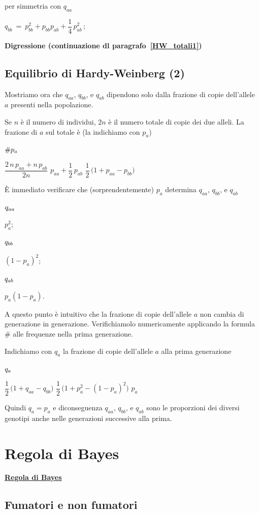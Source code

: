 \documentclass[12pt,openany]{book}
\theoremstyle{mio}
\theoremstyle{liscio}
\begin{document}
per simmetria con $q_{aa}$

$q_{bb}\ =\ p_{bb}^2+p_{bb}p_{ab} +\dfrac{1}{4}\,p^2_{ab}\,$;


\hfill{}\clearpage\hfill\textbf{Digressione (continuazione dl paragrafo~\ref{HW_totali1})}\subsection{Equilibrio di Hardy-Weinberg (2)}

\def\ceq#1#2#3{\parbox{12ex}{$\displaystyle #1$}\medrel{#2}$\displaystyle  #3$}

Mostriamo ora che $q_{aa}$, $q_{bb}$, e $q_{ab}$ dipendono solo dalla frazione di copie dell'allele $a$ presenti nella popolazione. 

Se $n$ \`e il numero di individui, $2n$ è il numero totale di copie dei due alleli. La frazione di $a$ sul totale è (la indichiamo con $p_a$)

\ceq{\#\hfill p_a}{=}{\dfrac{2\,n\,p_{aa}+n\,p_{ab}}{2n}}
\medrel{=}$p_{aa}+\dfrac12\,p_{ab}$
\medrel{=}$\dfrac12\,\big(1+p_{aa}-p_{bb}\big)$

È immediato verificare che (sorprendentemente) $p_a$ determina  $q_{aa}$, $q_{bb}$, e $q_{ab}$

\ceq{\hfill q_{aa}}{=}{p_a^2};
\ceq{\hfill q_{bb}}{=}{(1-p_a)^2};
\ceq{\hfill q_{ab}}{=}{p_a(1-p_a)}.

A questo punto è intuitivo che la frazione di copie dell'allele $a$ non cambia di generazione in generazione. Verifichiamolo numericamente applicando la formula $\#$ alle frequenze nella prima generazione.

Indichiamo con $q_a$ la frazione di copie dell'allele $a$ alla prima generazione

\ceq{\hfill q_a}{=}{\dfrac12\,\big(1+q_{aa}-q_{bb}\big)}
\medrel{=}$\dfrac12\,\big(1+p^2_{a}-(1-p_{a})^2\big)$
\medrel{=}$p_a$

Quindi $q_a=p_a$ e diconseguenza $q_{aa}$, $q_{bb}$, e $q_{ab}$ sono le proporzioni dei diversi genotipi anche nelle generazioni successive alla prima.


\hfill{}\clearpage\section{Regola di Bayes}
\label{Bayes}
\hfill\textbf{{\color{brown}\hyperref[RegolaBayes]{Regola di Bayes} \faShare}}
\subsection{Fumatori e non fumatori}
\label{Fumatori_Bayes}
\end{document}
